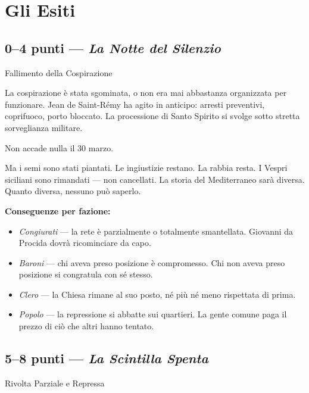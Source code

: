\secsep

\section{Gli Esiti}

\subsection{0--4 punti — \textit{La Notte del Silenzio}}
\textcolor{oro}{\cinzel\large Fallimento della Cospirazione}

\filetto

La cospirazione è stata sgominata, o non era mai abbastanza organizzata
per funzionare. Jean de Saint-Rémy ha agito in anticipo: arresti
preventivi, coprifuoco, porto bloccato. La processione di Santo
Spirito si svolge sotto stretta sorveglianza militare.

Non accade nulla il 30 marzo.

Ma i semi sono stati piantati. Le ingiustizie restano. La rabbia
resta. I Vespri siciliani sono rimandati — non cancellati. La storia
del Mediterraneo sarà diversa. Quanto diversa, nessuno può saperlo.

\textbf{Conseguenze per fazione:}
\begin{itemize}[nosep]
  \item \textit{Congiurati} — la rete è parzialmente o totalmente
    smantellata. Giovanni da Procida dovrà ricominciare da capo.
  \item \textit{Baroni} — chi aveva preso posizione è compromesso.
    Chi non aveva preso posizione si congratula con sé stesso.
  \item \textit{Clero} — la Chiesa rimane al suo posto, né più
    né meno rispettata di prima.
  \item \textit{Popolo} — la repressione si abbatte sui quartieri.
    La gente comune paga il prezzo di ciò che altri hanno tentato.
\end{itemize}


\secsep

\subsection{5--8 punti — \textit{La Scintilla Spenta}}
\textcolor{oro}{\cinzel\large Rivolta Parziale e Repressa}


